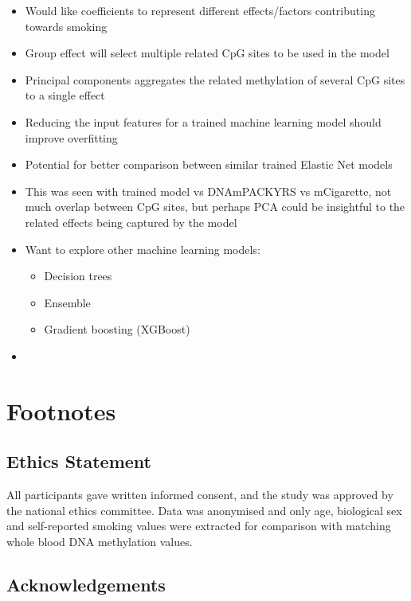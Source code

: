 \documentclass{article}
\begin{document}
\begin{itemize}
    \item Would like coefficients to represent different effects/factors contributing towards smoking
    \item Group effect will select multiple related CpG sites to be used in the model
    \item Principal components aggregates the related methylation of several CpG sites to a single effect
    \item Reducing the input features for a trained machine learning model should improve overfitting
    \item Potential for better comparison between similar trained Elastic Net models
    \item This was seen with trained model vs DNAmPACKYRS vs mCigarette, not much overlap between CpG sites, but perhaps PCA could be insightful to the related effects being captured by the model
\end{itemize}

\vspace{1cm}
\begin{itemize}
    \item Want to explore other machine learning models:
    \begin{itemize}
        \item Decision trees
        \item Ensemble
        \item Gradient boosting (XGBoost)
    \end{itemize}
    \item 
\end{itemize}

\section{Footnotes}

\subsection{Ethics Statement}
All participants gave written informed consent, and the study was approved by the national ethics committee. Data was anonymised and only age, biological sex and self-reported smoking values were extracted for comparison with matching whole blood DNA methylation values.

\subsection{Acknowledgements}

\printbibliography
\end{document}
